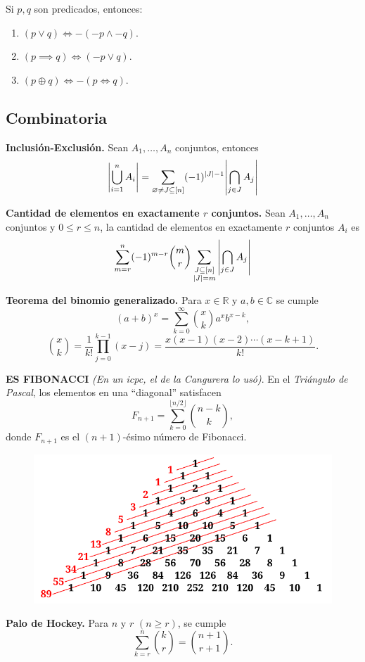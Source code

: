 \documentclass[12 pts,spanish,mexico]{article}
\numberwithin{equation}{section}
\newcommand{\R}{\mathbb{R}}
\begin{document}
\begin{multicols}{2}
Si $p, q$ son predicados, entonces:
\begin{enumerate}[1.]
    \item $(p \vee q) \iff -(-p \wedge -q)$.
    \item $(p \implies q) \iff (-p \vee q)$.
    \item $(p \oplus q) \iff -(p \iff q)$.
\end{enumerate}

\subsection{Combinatoria}

\textbf{Inclusión-Exclusión.} Sean $A_1, \dots, A_n$ conjuntos, entonces
$$\abs{\bigcup_{i = 1}^n A_i} = \sum_{\varnothing \neq J \subseteq [n]} (-1)^{|J| - 1}\abs{\bigcap_{j \in J} A_j}$$

\textbf{Cantidad de elementos en exactamente $r$ conjuntos.} Sean $A_1, \dots, A_n$ conjuntos y $0 \leq r \leq n$, la cantidad de elementos en exactamente $r$ conjuntos $A_i$ es
$$\sum_{m = r}^n (-1)^{m - r}\binom{m}{r}\sum_{\substack{J \subseteq [n]\\|J| = m}} \abs{\bigcap_{j \in J} A_j}$$

\textbf{Teorema del binomio generalizado.} Para $x \in \R$ y $a, b \in \mathbb{C}$ se cumple
$$(a + b)^x = \sum_{k = 0}^\infty \binom{x}{k}a^{x}b^{x - k},$$
$$\binom{x}{k} = \frac{1}{k!}\prod_{j = 0}^{k - 1}(x - j) = \frac{x(x - 1)(x - 2)\cdots(x - k + 1)}{k!}.$$

\textbf{ES FIBONACCI} \textit{(En un icpc, el de la Cangurera lo usó)}. En el \textit{Triángulo de Pascal}, los elementos en una ``diagonal'' satisfacen
\[
F_{n+1} = \sum_{k=0}^{\lfloor n/2 \rfloor} \binom{n-k}{k},
\]
donde \( F_{n+1} \) es el \((n+1)\)-ésimo número de Fibonacci.

\begin{figure}[H]
    \centering
	\includegraphics[width=0.5\linewidth]{img/FiboPascal.png}
\end{figure}

\textbf{Palo de Hockey.}
Para \( n \) y \( r \) \((n \geq r)\), se cumple
\[
\sum_{k=r}^{n} \binom{k}{r} = \binom{n+1}{r+1}.
\]


\end{multicols}
\end{document}
